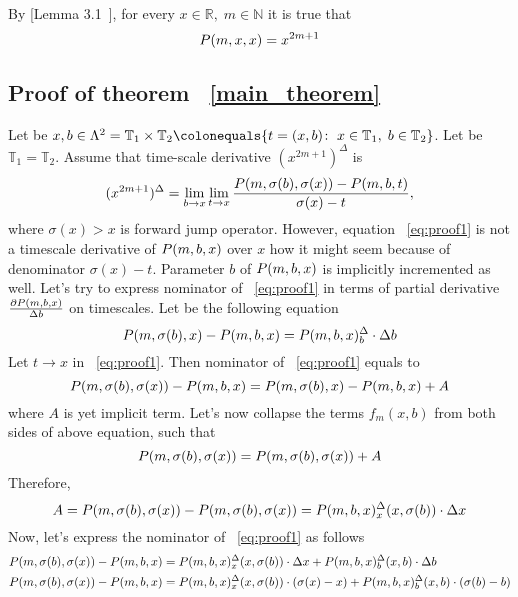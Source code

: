 By [Lemma 3.1~\cite{kolosov2016link}], for every $x\in\mathbb{R}, \; m\in\mathbb{N}$ it is true that
\begin{equation}
    \label{eq:odd_power_identity}
    P ( m, x, x ) = x^{2m+1}
\end{equation}

\subsection*{Proof of theorem ~\ref{main_theorem}}
Let be
$x,b\in \Lambda^2 = \mathbb{T}_1 \times \mathbb{T}_2
\colonequals \{t = (x,b) \colon \; x\in\mathbb{T}_1, \; b\in\mathbb{T}_2\}$.
Let be $\mathbb{T}_1 = \mathbb{T}_2$.
Assume that time-scale derivative $(x^{2m+1})^{\Delta}$ is
\begin{equation}
    \label{eq:proof1}
    (x^{2m+1})^{\Delta}
    = \lim \limits_{b \to x}
    \lim \limits_{t \to x}
    \frac{P ( m, \sigma(b), \sigma(x) ) - P ( m, b, t )}{\sigma(x) - t},
\end{equation}
where $\sigma(x) > x$ is forward jump operator.
However, equation ~\eqref{eq:proof1} is not a timescale derivative of $P ( m, b, x )$ over $x$
how it might seem because of denominator $\sigma(x) - t$.
Parameter $b$ of $P ( m, b, x )$ is implicitly incremented as well.
Let's try to express nominator of ~\eqref{eq:proof1} in terms of
partial derivative $\frac{\partial P ( m, b, x )}{\Delta b}$ on timescales.
Let be the following equation
\[
    P ( m, \sigma(b), x ) - P ( m, b, x )
    = P ( m, b, x )^{\Delta}_{b} \cdot \Delta b
\]
Let $t \to x$ in ~\eqref{eq:proof1}.
Then nominator of ~\eqref{eq:proof1} equals to
\[
    P ( m, \sigma(b), \sigma(x) ) - P ( m, b, x )
    = P ( m, \sigma(b), x ) - P ( m, b, x ) + A
\]
where $A$ is yet implicit term.
Let's now collapse the terms $f_m (x, b)$ from both sides of above equation, such that
\[
    P ( m, \sigma(b), \sigma(x) ) = P ( m, \sigma(b), \sigma(x) ) + A
\]
Therefore,
\[
    A = P ( m, \sigma(b), \sigma(x) ) - P ( m, \sigma(b), \sigma(x) )
    = P ( m, b, x )^{\Delta}_{x} (x, \sigma(b)) \cdot \Delta x
\]
Now, let's express the nominator of ~\eqref{eq:proof1} as follows
\begin{align*}
    P ( m, \sigma(b), \sigma(x) ) - P ( m, b, x )
    &= P ( m, b, x )^{\Delta}_{x} (x, \sigma(b)) \cdot \Delta x + P ( m, b, x )^{\Delta}_{b} (x,b) \cdot \Delta b \\
    P ( m, \sigma(b), \sigma(x) ) - P ( m, b, x )
    &= P ( m, b, x )^{\Delta}_{x} (x, \sigma(b)) \cdot (\sigma(x) - x) + P ( m, b, x )^{\Delta}_{b} (x,b) \cdot (\sigma(b) - b)
\end{align*}
